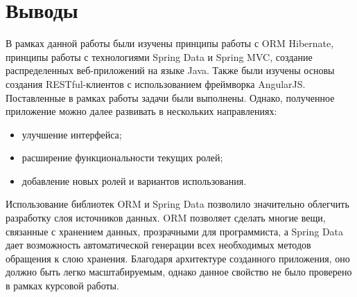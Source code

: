 \section{Выводы}
	В рамках данной работы были изучены принципы работы с ORM Hibernate, принципы работы с технологиями Spring Data и Spring MVC, создание распределенных веб-приложений на языке Java. Также были изучены основы создания RESTful-клиентов с использованием фреймворка AngularJS. Поставленные в рамках работы задачи были выполнены. Однако, полученное приложение можно далее развивать в нескольких направлениях:
	\begin{itemize}
		\item улучшение интерфейса;
		\item расширение функциональности текущих ролей;
		\item добавление новых ролей и вариантов использования.
	\end{itemize}
	
	Использование библиотек ORM и Spring Data позволило значительно облегчить разработку слоя источников данных. ORM позволяет сделать многие вещи, связанные с хранением данных, прозрачными для программиста, а Spring Data дает возможность автоматической генерации всех необходимых методов обращения к слою хранения. Благодаря архитектуре созданного приложения, оно должно быть легко масштабируемым, однако данное свойство не было проверено в рамках курсовой работы.
	